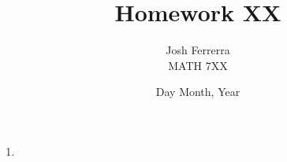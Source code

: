 \documentclass[10pt]{article}
\begin{document}
\title{Homework XX}
\author{Josh Ferrerra
    \\MATH 7XX}
\date{Day Month, Year}
\maketitle

\begin{enumerate}
    \item 
\end{enumerate}
\end{document}

